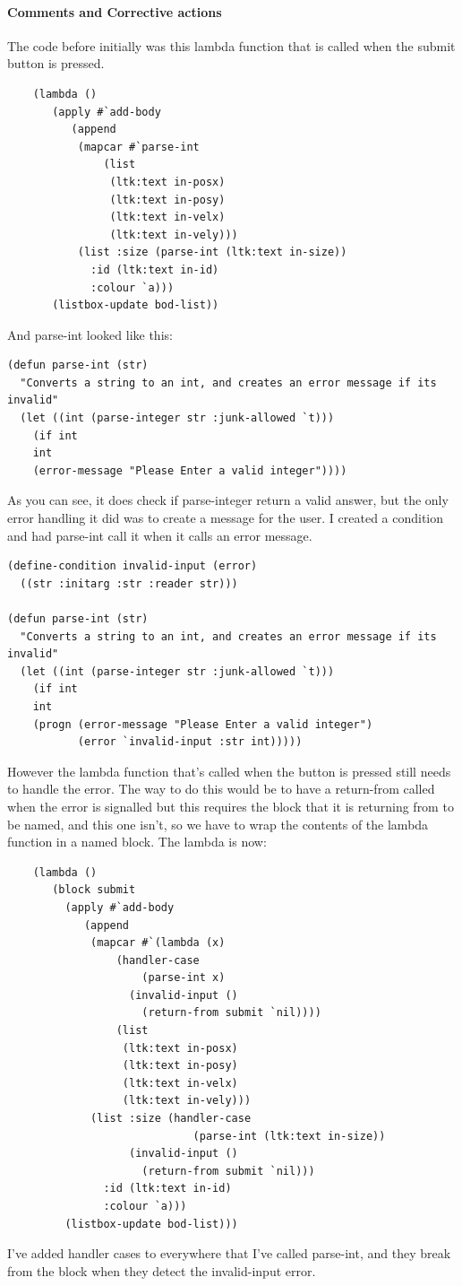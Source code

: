\paragraph{Comments and Corrective actions}
The code before initially was this lambda function that is called when the
submit button is pressed. 
\begin{lstlisting}
	(lambda ()
	   (apply #`add-body
		  (append
		   (mapcar #`parse-int
			   (list
			    (ltk:text in-posx)
			    (ltk:text in-posy)
			    (ltk:text in-velx)
			    (ltk:text in-vely)))
		   (list :size (parse-int (ltk:text in-size))
			 :id (ltk:text in-id)
			 :colour `a)))
	   (listbox-update bod-list))
\end{lstlisting}
And parse-int looked like this:
\begin{lstlisting}
(defun parse-int (str)
  "Converts a string to an int, and creates an error message if its invalid"
  (let ((int (parse-integer str :junk-allowed `t)))
    (if int
	int
	(error-message "Please Enter a valid integer"))))
\end{lstlisting}
As you can see, it does check if parse-integer return a valid answer, but the
only error handling it did was to create a message for the user. I created a
condition and had parse-int call it when it calls an error message.
\begin{lstlisting}
(define-condition invalid-input (error)
  ((str :initarg :str :reader str)))

(defun parse-int (str)
  "Converts a string to an int, and creates an error message if its invalid"
  (let ((int (parse-integer str :junk-allowed `t)))
    (if int
	int
	(progn (error-message "Please Enter a valid integer")
	       (error `invalid-input :str int)))))
\end{lstlisting}
However the lambda function that's called when the button is pressed still needs
to handle the error. The way to do this would be to have a return-from called
when the error is signalled but this requires the block that it is returning
from to be named, and this one isn't, so we have to wrap the contents of the
lambda function in a named block. The lambda is now:
\begin{lstlisting}
	(lambda ()
	   (block submit
	     (apply #`add-body
		    (append
		     (mapcar #`(lambda (x)
				 (handler-case
				     (parse-int x)
				   (invalid-input ()
				     (return-from submit `nil))))
			     (list
			      (ltk:text in-posx)
			      (ltk:text in-posy)
			      (ltk:text in-velx)
			      (ltk:text in-vely)))
		     (list :size (handler-case 
		     	             (parse-int (ltk:text in-size))
				   (invalid-input ()
				     (return-from submit `nil)))
			   :id (ltk:text in-id)
			   :colour `a)))
	     (listbox-update bod-list)))
\end{lstlisting}
I've added handler cases to everywhere that I've called parse-int, and they
break from the block when they detect the invalid-input error.
